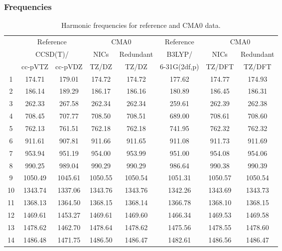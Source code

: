 \documentclass[10pt,oneside]{article}
\begin{document}
\begin{table}[h!]
\subsubsection*{Frequencies}
\centering
\caption{Harmonic frequencies for reference and CMA0 data.}
\begin{tabular}{cccccccc}
\toprule
{} & \multicolumn{2}{c}{Reference} & \multicolumn{2}{c}{CMA0} &    Reference & \multicolumn{2}{c}{CMA0} \\
{} & \multicolumn{2}{c}{CCSD(T)/} &    NICs &  Redundant &       B3LYP/ &    NICs & Redundant \\
{} &   cc-pVTZ & cc-pVDZ &   TZ/DZ &      TZ/DZ & 6-31G(2df,p) &  TZ/DFT &    TZ/DFT \\
\midrule
1  &    174.71 &  179.01 &  174.72 &     174.72 &       177.62 &  174.77 &    174.93 \\
2  &    186.14 &  189.29 &  186.17 &     186.16 &       180.89 &  186.45 &    186.31 \\
3  &    262.33 &  267.58 &  262.34 &     262.34 &       259.61 &  262.39 &    262.38 \\
4  &    708.45 &  707.77 &  708.50 &     708.51 &       689.00 &  708.61 &    708.60 \\
5  &    762.13 &  761.51 &  762.18 &     762.18 &       741.95 &  762.32 &    762.32 \\
6  &    911.61 &  907.81 &  911.66 &     911.65 &       911.08 &  911.73 &    911.69 \\
7  &    953.94 &  951.19 &  954.00 &     953.99 &       951.00 &  954.08 &    954.06 \\
8  &    990.25 &  989.04 &  990.29 &     990.29 &       986.64 &  990.38 &    990.39 \\
9  &   1050.49 & 1045.61 & 1050.55 &    1050.54 &      1051.31 & 1050.57 &   1050.54 \\
10 &   1343.74 & 1337.06 & 1343.76 &    1343.76 &      1342.26 & 1343.69 &   1343.73 \\
11 &   1368.13 & 1364.50 & 1368.15 &    1368.14 &      1366.78 & 1368.10 &   1368.15 \\
12 &   1469.61 & 1453.27 & 1469.61 &    1469.60 &      1466.34 & 1469.53 &   1469.58 \\
13 &   1478.62 & 1462.70 & 1478.64 &    1478.62 &      1475.56 & 1478.55 &   1478.60 \\
14 &   1486.48 & 1471.75 & 1486.50 &    1486.47 &      1482.61 & 1486.56 &   1486.47 \\

\end{tabular}
\end{table}
\end{document}
